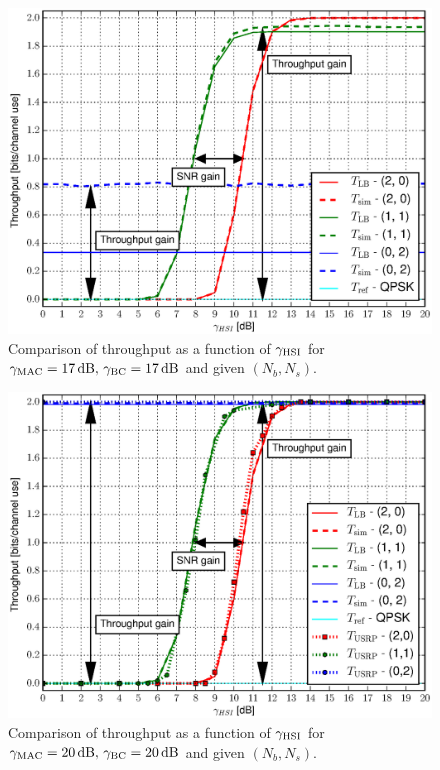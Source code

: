 \documentclass{article}
\begin{document}
\begin{figure}
\begin{centering}
\hspace*{-0.04\columnwidth}\includegraphics[width=0.95\columnwidth]{fig/Throughput_HSI_XOR_MAC17_BC17_N2}
\par\end{centering}

\caption{Comparison of throughput as a function of $\gamma_{{\rm {HSI}}}$
for $\gamma_{{\rm {MAC}}}=17\,\mathrm{dB},\,\gamma_{{\rm {BC}}}=17\,\mathrm{dB}$
and given $(N_{b},N_{s})$.\label{fig:CTUpp_Throughput17_17}}
\end{figure}


\begin{figure}
\begin{centering}
\hspace*{-0.04\columnwidth}\includegraphics[width=0.95\columnwidth]{fig/Throughput_HSI_XOR_MAC20_BC20_N2}
\par\end{centering}

\caption{Comparison of throughput as a function of $\gamma_{{\rm {HSI}}}$
for $\gamma_{{\rm {MAC}}}=20\,\mathrm{dB},\,\gamma_{{\rm {BC}}}=20\,\mathrm{dB}$
and given $(N_{b},N_{s})$. \label{fig:CTUpp_Throughput20_20}}
\end{figure}
\end{document}
